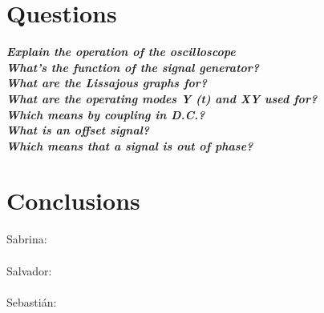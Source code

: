 \documentclass[letterpaper]{article}
\begin{document}
\section{Questions}
\textit{\textbf{Explain the operation of the oscilloscope}}\\
\textit{\textbf{What's the function of the signal generator?}}\\
\textit{\textbf{What are the Lissajous graphs for?}}\\
\textit{\textbf{What are the operating modes Y (t) and XY used for?}}\\
\textit{\textbf{Which means by coupling in D.C.?}}\\
\textit{\textbf{What is an offset signal?}}\\
\textit{\textbf{Which means that a signal is out of phase?}}\\
\section{Conclusions}
{\large Sabrina:}\\
%
\\[2ex]
{\large Salvador:}\\
%
\\[2ex]
{\large Sebastián:}\\
\end{document}
